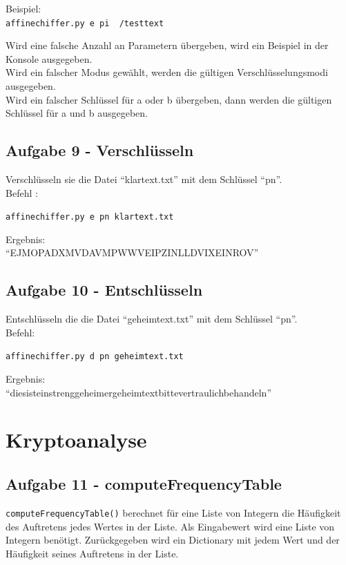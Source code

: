 \documentclass[12pt]{article}
\begin{document}
Beispiel:\\
\texttt{affinechiffer.py e pi ~/testtext}

Wird eine falsche Anzahl an Parametern \"ubergeben, wird ein Beispiel in der Konsole ausgegeben.\\
Wird ein falscher Modus gew\"ahlt, werden die g\"ultigen Verschl\"usselungsmodi ausgegeben.\\
Wird ein falscher Schl\"ussel f\"ur a oder b \"ubergeben, dann werden die g\"ultigen Schl\"ussel f\"ur a und b ausgegeben.\\
			
\newpage
			
 
\newpage
		\subsection{Aufgabe 9 - Verschl\"usseln}
		Verschl\"usseln sie die Datei \enquote{klartext.txt} mit dem Schl\"ussel \enquote{pn}.\\
Befehl :
		\begin{center}
			\texttt{affinechiffer.py e pn klartext.txt}
		\end{center}
Ergebnis:\\
\enquote{EJMOPADXMVDAVMPWWVEIPZINLLDVIXEINROV}
 
		\subsection{Aufgabe 10 - Entschl\"usseln}
		Entschl\"usseln die die Datei \enquote{geheimtext.txt} mit dem Schl\"ussel \enquote{pn}.\\
Befehl:
			\begin{center}
				\texttt{affinechiffer.py d pn geheimtext.txt}
			\end{center}
Ergebnis:\\ \enquote{diesisteinstrenggeheimergeheimtextbittevertraulichbehandeln}

\newpage

	\section{Kryptoanalyse}
		\subsection{\label{ssec:Aufgabe11}Aufgabe 11 - computeFrequencyTable}
		\texttt{computeFrequencyTable()} berechnet f\"ur eine Liste von Integern die H\"aufigkeit des Auftretens jedes Wertes in der Liste.
Als Eingabewert wird eine Liste von Integern ben\"otigt. Zur\"uckgegeben wird ein Dictionary mit jedem Wert und der H\"aufigkeit seines Auftretens in der Liste.
			
			
\end{document}
